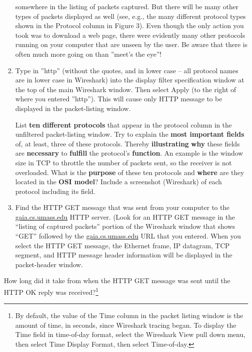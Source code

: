 \documentclass[11pt,a4paper]{article}
\begin{document}
\begin{enumerate}
    somewhere in the listing of packets captured. But there will be many other types
    of packets displayed as well (see, e.g., the many different protocol types shown in
    the Protocol column in Figure 3). Even though the only action you took was to
    download a web page, there were evidently many other protocols running on your
    computer that are unseen by the user. Be aware that there is often much more going on than ''meet’s the eye''!
    \item Type in ''http'' (without the quotes, and in lower case – all protocol names are in
    lower case in Wireshark) into the display filter specification window at the top of
    the main Wireshark window. Then select Apply (to the right of where you entered
    ''http''). This will cause only HTTP message to be displayed in the packet-listing
    window.
    
    \begin{question}
        List \textbf{ten different protocols} that appear in the protocol column in the unfiltered packet-listing window. Try to explain the \textbf{most important fields} of, at least, three of these protocols. Thereby \textbf{illustrating} \textbf{why} these fields are \textbf{necessary} to \textbf{fulfill} the protocol's \textbf{function}. An example is the window size in TCP to throttle the number of packets sent, so the receiver is not overloaded.
        What is the \textbf{purpose} of these ten protocols and \textbf{where} are they located in the \textbf{OSI model}? Include a screenshot (Wireshark) of each protocol including its field.
    \end{question}%
    
    
    
    
    \item Find the HTTP GET message that was sent from your computer to the
    \url{gaia.cs.umass.edu} HTTP server. (Look for an HTTP GET message in the ``listing
    of captured packets'' portion of the Wireshark window  that shows
    ``GET'' followed by the \url{gaia.cs.umass.edu} URL that you entered. When you
    select the HTTP GET message, the Ethernet frame, IP datagram, TCP segment,
    and HTTP message header information will be displayed in the packet-header
    window. 
\end{enumerate}

\begin{question}
    How long did it take from when the HTTP GET message was sent until the HTTP
	OK reply was received?\footnote{By default, the value of the Time column in the packet listing
		window is the amount of time, in seconds, since Wireshark tracing began.
		To display the Time field in time-of-day format, select the Wireshark View pull
		down menu, then select Time Display Format, then select Time-of-day.}
\end{question}
\end{document}

